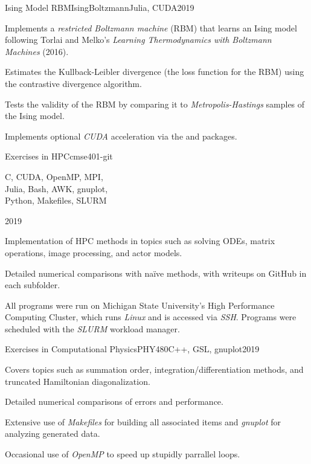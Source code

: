 \begin{project}{Ising Model RBM}{IsingBoltzmann}{Julia, CUDA}{2019}
    \item Implements a \emph{restricted Boltzmann machine} (RBM)
        that learns an Ising model following Torlai and Melko's
        \textit{Learning Thermodynamics with Boltzmann Machines} (2016).
    \item Estimates the Kullback-Leibler divergence
        (the loss function for the RBM)
        using the contrastive divergence algorithm.
    \item Tests the validity of the RBM
        by comparing it to \emph{Metropolis-Hastings} samples
        of the Ising model.
    \item Implements optional \emph{CUDA} acceleration
        via the  and  packages.
\end{project}

\begin{project}{Exercises in HPC}{cmse401-git}%
               {\parbox[t]{2in}%
                   {C, CUDA, OpenMP, MPI,\\
                    Julia, Bash, AWK, gnuplot,\\
                    Python, Makefiles, SLURM}}%
               {2019}
    \item Implementation of HPC methods in topics such as
        solving ODEs, 
        matrix operations,
        image processing,
        and actor models.
    \item Detailed numerical comparisons with na\"ive methods,
        with writeups on GitHub in each subfolder.
    \item All programs were run
        on Michigan State University's High Performance Computing Cluster,
        which runs \emph{Linux} and is accessed via \emph{SSH}.
    Programs were scheduled with the \emph{SLURM} workload manager.
\end{project}

\begin{project}{Exercises in Computational Physics}{PHY480}{C++, GSL, gnuplot}{2019}
    \item Covers topics such as
        summation order,
        integration/differentiation methods,
        and truncated Hamiltonian diagonalization.
    \item Detailed numerical comparisons of errors and performance.
    \item Extensive use of \emph{Makefiles} for building all associated items
        and \emph{gnuplot} for analyzing generated data.
    \item Occasional use of \emph{OpenMP} to speed up stupidly parrallel loops.
\end{project}

